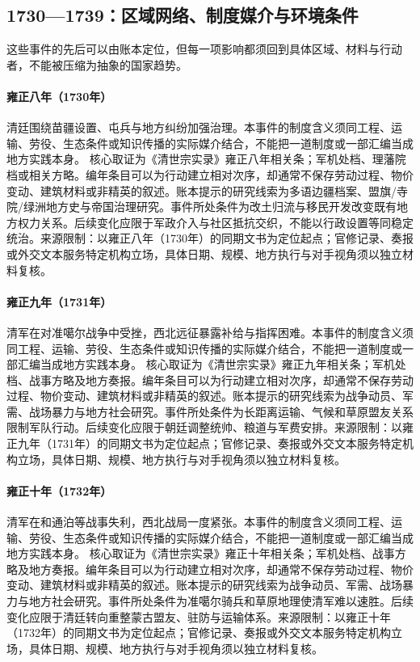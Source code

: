 \subsection{1730—1739：区域网络、制度媒介与环境条件}
这些事件的先后可以由账本定位，但每一项影响都须回到具体区域、材料与行动者，不能被压缩为抽象的国家趋势。
\hypertarget{civic:EQ-1730-SOUTHWEST-MIAO-GOVERNANCE}{}\paragraph{雍正八年（1730年）}清廷围绕苗疆设置、屯兵与地方纠纷加强治理。本事件的制度含义须同工程、运输、劳役、生态条件或知识传播的实际媒介结合，不能把一道制度或一部汇编当成地方实践本身。 核心取证为《清世宗实录》雍正八年相关条；军机处档、理藩院档或相关方略。编年条目可以为行动建立相对次序，却通常不保存劳动过程、物价变动、建筑材料或非精英的叙述。账本提示的研究线索为多语边疆档案、盟旗/寺院/绿洲地方史与帝国治理研究。事件所处条件为改土归流与移民开发改变既有地方权力关系。后续变化应限于军政介入与社区抵抗交织，不能以行政设置等同稳定统治。来源限制：以雍正八年（1730年）的同期文书为定位起点；官修记录、奏报或外交文本服务特定机构立场，具体日期、规模、地方执行与对手视角须以独立材料复核。
\hypertarget{civic:EQ-1731-Dzungar-WAR-REVERSE}{}\paragraph{雍正九年（1731年）}清军在对准噶尔战争中受挫，西北远征暴露补给与指挥困难。本事件的制度含义须同工程、运输、劳役、生态条件或知识传播的实际媒介结合，不能把一道制度或一部汇编当成地方实践本身。 核心取证为《清世宗实录》雍正九年相关条；军机处档、战事方略及地方奏报。编年条目可以为行动建立相对次序，却通常不保存劳动过程、物价变动、建筑材料或非精英的叙述。账本提示的研究线索为战争动员、军需、战场暴力与地方社会研究。事件所处条件为长距离运输、气候和草原盟友关系限制军队行动。后续变化应限于朝廷调整统帅、粮道与军费安排。来源限制：以雍正九年（1731年）的同期文书为定位起点；官修记录、奏报或外交文本服务特定机构立场，具体日期、规模、地方执行与对手视角须以独立材料复核。
\hypertarget{civic:EQ-1732-KOBDO-BATTLE}{}\paragraph{雍正十年（1732年）}清军在和通泊等战事失利，西北战局一度紧张。本事件的制度含义须同工程、运输、劳役、生态条件或知识传播的实际媒介结合，不能把一道制度或一部汇编当成地方实践本身。 核心取证为《清世宗实录》雍正十年相关条；军机处档、战事方略及地方奏报。编年条目可以为行动建立相对次序，却通常不保存劳动过程、物价变动、建筑材料或非精英的叙述。账本提示的研究线索为战争动员、军需、战场暴力与地方社会研究。事件所处条件为准噶尔骑兵和草原地理使清军难以速胜。后续变化应限于清廷转向重整蒙古盟友、驻防与运输体系。来源限制：以雍正十年（1732年）的同期文书为定位起点；官修记录、奏报或外交文本服务特定机构立场，具体日期、规模、地方执行与对手视角须以独立材料复核。
